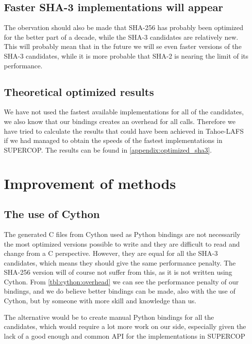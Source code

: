 \documentclass[english,12pt,a4paper]{book}
\begin{document}
\subsection{Faster \ac{SHA}-3 implementations will appear}

The obervation should also be made that \ac{SHA}-256 has probably been
optimized for the better part of a decade, while the \ac{SHA}-3 candidates are
relatively new. This will probably mean that in the future we will se even
faster versions of the \ac{SHA}-3 candidates, while it is more probable that
\ac{SHA}-2 is nearing the limit of its performance.

\subsection{Theoretical optimized results}

We have not used the fastest available implementations for all of the
candidates, we also know that our bindings creates an overhead for all calls.
Therefore we have tried to calculate the results that could have been achieved
in Tahoe-\ac{LAFS} if we had managed to obtain the speeds of the fastest
implementations in \ac{SUPERCOP}. The results can be found in
\autoref{appendix:optimized_sha3}.

\section{Improvement of methods}

\subsection{The use of Cython}

The generated C files from Cython used as Python bindings are not necessarily
the most optimized versions possible to write and they are difficult to read and
change from a C perspective. However, they are equal for all the \ac{SHA}-3
candidates, which means they should give the same performance penalty. The
\ac{SHA}-256 version will of course not suffer from this, as it is not written
using Cython. From \autoref{tbl:cython:overhead} we can see the performance
penalty of our bindings, and we do believe better bindings can be made, also
with the use of Cython, but by someone with more skill and knowledge than us.

The alternative would be to create manual Python bindings for all the
candidates, which would require a lot more work on our side, especially given
the lack of a good enough and common \ac{API} for the implementations in
\ac{SUPERCOP}
\end{document}
